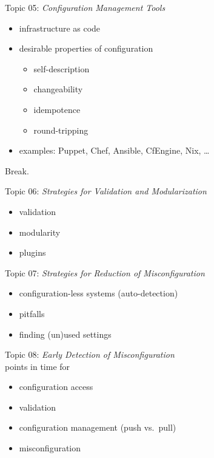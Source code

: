 \begin{frame}
	Topic 05: \textit{Configuration Management Tools}
	\begin{itemize}
		\item infrastructure as code
		\item desirable properties of configuration
		\begin{itemize}
			\item self-description
			\item changeability
			\item idempotence
			\item round-tripping
		\end{itemize}
		\item examples: Puppet, Chef, Ansible, CfEngine, Nix, \dots
	\end{itemize}
\end{frame}

\begin{assignment}
	\begin{task}
	Break.
	\end{task}
\end{assignment}

\begin{frame}
	Topic 06: \textit{Strategies for Validation and Modularization}
	\begin{itemize}
		\item validation
		\item modularity
		\item plugins
	\end{itemize}
\end{frame}

\begin{frame}
	Topic 07: \textit{Strategies for Reduction of Misconfiguration}
	\begin{itemize}
		\item configuration-less systems (auto-detection)
		\item pitfalls
		\item finding (un)used settings
	\end{itemize}
\end{frame}

\begin{frame}
	Topic 08: \textit{Early Detection of Misconfiguration}
	\\ \vspace{1cm}
	points in time for
	\begin{itemize}
		\item configuration access
		\item validation
		\item configuration management (push vs.\ pull)
		\item misconfiguration
	\end{itemize}
\end{frame}

